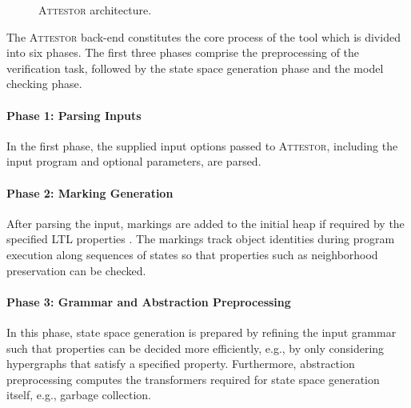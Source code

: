 \documentclass[a4paper, 12pt, twoside]{report}
\begin{document}
\begin{figure}
\begin{center}
{}
			\caption{\textsc{Attestor} architecture. \cite{arndt2018let}}\label{fig:attestor}
		\end{center}
	\end{figure}
	
	The \textsc{Attestor} back-end constitutes the core process of the tool which is divided into six phases. The first three phases comprise the preprocessing of the verification task, followed by the state space generation phase and the model checking phase.
	
	\paragraph{Phase 1: Parsing Inputs}
	In the first phase, the supplied input options passed to \textsc{Attestor}, including the input program and optional parameters, are parsed.
	
	\paragraph{Phase 2: Marking Generation} 
	After parsing the input, markings are added to the initial heap if required by the specified LTL properties \cite{heinen2015verifyingPhd}. The markings track object identities during program execution along sequences of states so that properties such as neighborhood preservation can be checked.\\
	
	\paragraph{Phase 3: Grammar and Abstraction Preprocessing}
	In this phase, state space generation is prepared by refining the input grammar such that properties can be decided more efficiently, e.g., by only considering hypergraphs that satisfy a specified property. Furthermore, abstraction preprocessing computes the transformers required for state space generation itself, e.g., garbage collection. 
	
\end{document}
